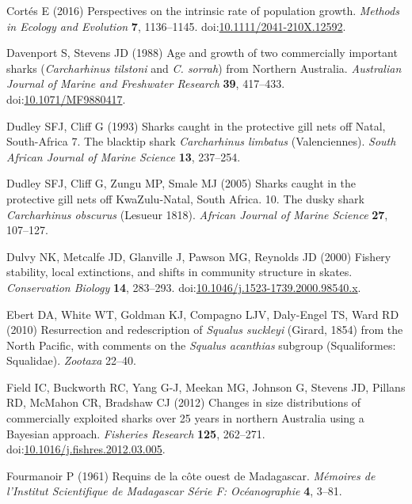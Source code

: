 \documentclass[]{article}
\begin{document}
\hypertarget{ref-cortes_perspectives_2016}{}
Cortés E (2016) Perspectives on the intrinsic rate of population growth.
\emph{Methods in Ecology and Evolution} \textbf{7}, 1136--1145.
doi:\href{https://doi.org/10.1111/2041-210X.12592}{10.1111/2041-210X.12592}.

\hypertarget{ref-davenport_age_1988}{}
Davenport S, Stevens JD (1988) Age and growth of two commercially
important sharks (\emph{Carcharhinus tilstoni} and \emph{C. sorrah})
from Northern Australia. \emph{Australian Journal of Marine and
Freshwater Research} \textbf{39}, 417--433.
doi:\href{https://doi.org/10.1071/MF9880417}{10.1071/MF9880417}.

\hypertarget{ref-dudley_sharks_1993}{}
Dudley SFJ, Cliff G (1993) Sharks caught in the protective gill nets off
Natal, South-Africa 7. The blacktip shark \emph{Carcharhinus limbatus}
(Valenciennes). \emph{South African Journal of Marine Science}
\textbf{13}, 237--254.

\hypertarget{ref-dudley_sharks_2005}{}
Dudley SFJ, Cliff G, Zungu MP, Smale MJ (2005) Sharks caught in the
protective gill nets off KwaZulu-Natal, South Africa. 10. The dusky
shark \emph{Carcharhinus obscurus} (Lesueur 1818). \emph{African Journal
of Marine Science} \textbf{27}, 107--127.

\hypertarget{ref-dulvy_fishery_2000}{}
Dulvy NK, Metcalfe JD, Glanville J, Pawson MG, Reynolds JD (2000)
Fishery stability, local extinctions, and shifts in community structure
in skates. \emph{Conservation Biology} \textbf{14}, 283--293.
doi:\href{https://doi.org/10.1046/j.1523-1739.2000.98540.x}{10.1046/j.1523-1739.2000.98540.x}.

\hypertarget{ref-ebert_resurrection_2010}{}
Ebert DA, White WT, Goldman KJ, Compagno LJV, Daly-Engel TS, Ward RD
(2010) Resurrection and redescription of \emph{Squalus suckleyi}
(Girard, 1854) from the North Pacific, with comments on the
\emph{Squalus acanthias} subgroup (Squaliformes: Squalidae).
\emph{Zootaxa} 22--40.

\hypertarget{ref-field_changes_2012}{}
Field IC, Buckworth RC, Yang G-J, Meekan MG, Johnson G, Stevens JD,
Pillans RD, McMahon CR, Bradshaw CJ (2012) Changes in size distributions
of commercially exploited sharks over 25 years in northern Australia
using a Bayesian approach. \emph{Fisheries Research} \textbf{125},
262--271.
doi:\href{https://doi.org/10.1016/j.fishres.2012.03.005}{10.1016/j.fishres.2012.03.005}.

\hypertarget{ref-fourmanoir_requins_1961}{}
Fourmanoir P (1961) Requins de la côte ouest de Madagascar.
\emph{Mémoires de l'Institut Scientifique de Madagascar Série F:
Océanographie} \textbf{4}, 3--81.
\end{document}
